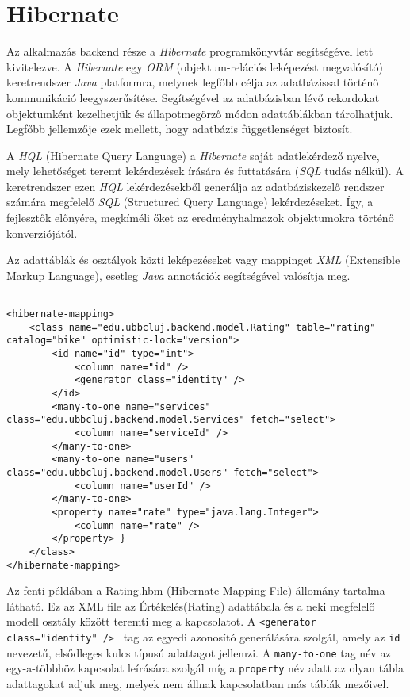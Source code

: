 %
\section{Hibernate}\label{sec:FELH:hi}

\par Az alkalmazás backend része a \textit{Hibernate} programkönyvtár segítségével lett kivitelezve. A \textit{Hibernate} egy \textit{ORM} (objektum-relációs leképezést megvalósító) keretrendszer \textit{Java} platformra, melynek legfőbb célja az adatbázissal történő kommunikáció leegyszerűsítése. Segítségével az adatbázisban lévő rekordokat objektumként kezelhetjük és állapotmegörző módon adattáblákban tárolhatjuk. Legfőbb jellemzője ezek mellett, hogy adatbázis függetlenséget biztosít.
\par A \textit{HQL} (Hibernate Query Language) a \textit{Hibernate} saját adatlekérdező nyelve, mely lehetőséget teremt lekérdezések írására és futtatására (\textit{SQL} tudás nélkül). A keretrendszer ezen \textit{HQL} lekérdezésekből generálja az adatbáziskezelő rendszer számára megfelelő \textit{SQL} (Structured Query Language) lekérdezéseket. Így, a fejlesztők előnyére, megkíméli őket az eredményhalmazok objektumokra történő konverziójától.
\par Az adattáblák és osztályok közti leképezéseket vagy mappinget \textit{XML} (Extensible Markup Language), esetleg \textit{Java} annotációk segítségével valósítja meg. 

\lstset{language=XML}
\begin{lstlisting}

<hibernate-mapping>
    <class name="edu.ubbcluj.backend.model.Rating" table="rating" catalog="bike" optimistic-lock="version">
        <id name="id" type="int">
            <column name="id" />
            <generator class="identity" />
        </id>
        <many-to-one name="services" class="edu.ubbcluj.backend.model.Services" fetch="select">
            <column name="serviceId" />
        </many-to-one>
        <many-to-one name="users" class="edu.ubbcluj.backend.model.Users" fetch="select">
            <column name="userId" />
        </many-to-one>
        <property name="rate" type="java.lang.Integer">
            <column name="rate" />
        </property> }
    </class>
</hibernate-mapping>
\end{lstlisting}

\par 
Az fenti példában a Rating.hbm (Hibernate Mapping File) állomány tartalma látható. Ez az XML file az Értékelés(Rating) adattábala és a neki megfelelő modell osztály között teremti meg a kapcsolatot. A {\tt <generator class="identity" /> } tag az egyedi azonosító generálására szolgál, amely az {\tt id} nevezetű, elsődleges kulcs típusú adattagot jellemzi. A {\tt many-to-one} tag név az egy-a-többhöz kapcsolat leírására szolgál míg a {\tt  property} név alatt az olyan tábla adattagokat adjuk meg, melyek nem állnak kapcsolatban más táblák mezőivel.

